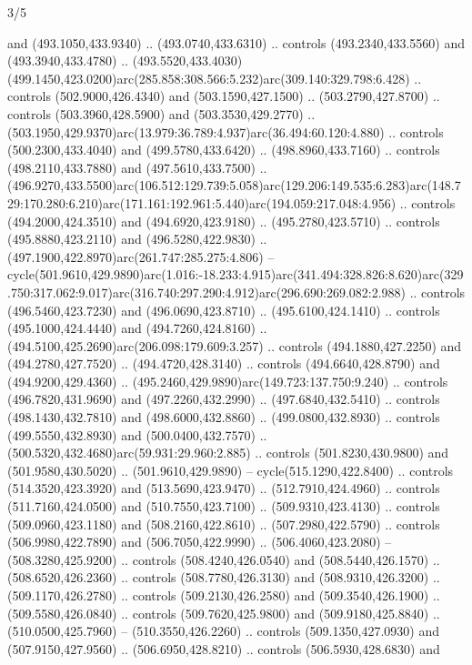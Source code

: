 \begin{flagdescription}{3/5}
\begin{scope}[shift={(0.5\flaglength,0.5\flagwidth)},scale=\flagwidth/510]
\begin{scope}[y=0.80pt, x=0.80pt, yscale=-1.06, xscale=1.06,yshift=-240pt,xshift=-400pt]
\begin{scope}[cm={{0.83333,0.0,0.0,0.83333,(154.64672,48.64761)}}]
\begin{scope}[cm={{0.93334,0.0,0.0,0.93334,(-4.86471,22.64035)}}]
\begin{scope}[draw=black]
  and (493.1050,433.9340) .. (493.0740,433.6310) .. controls (493.2340,433.5560)
  and (493.3940,433.4780) ..
  (493.5520,433.4030)(499.1450,423.0200)arc(285.858:308.566:5.232)arc(309.140:329.798:6.428)
  .. controls (502.9000,426.4340) and (503.1590,427.1500) .. (503.2790,427.8700)
  .. controls (503.3960,428.5900) and (503.3530,429.2770) ..
  (503.1950,429.9370)arc(13.979:36.789:4.937)arc(36.494:60.120:4.880) ..
  controls (500.2300,433.4040) and (499.5780,433.6420) .. (498.8960,433.7160) ..
  controls (498.2110,433.7880) and (497.5610,433.7500) ..
  (496.9270,433.5500)arc(106.512:129.739:5.058)arc(129.206:149.535:6.283)arc(148.729:170.280:6.210)arc(171.161:192.961:5.440)arc(194.059:217.048:4.956)
  .. controls (494.2000,424.3510) and (494.6920,423.9180) .. (495.2780,423.5710)
  .. controls (495.8880,423.2110) and (496.5280,422.9830) ..
  (497.1900,422.8970)arc(261.747:285.275:4.806) --
  cycle(501.9610,429.9890)arc(1.016:-18.233:4.915)arc(341.494:328.826:8.620)arc(329.750:317.062:9.017)arc(316.740:297.290:4.912)arc(296.690:269.082:2.988)
  .. controls (496.5460,423.7230) and (496.0690,423.8710) .. (495.6100,424.1410)
  .. controls (495.1000,424.4440) and (494.7260,424.8160) ..
  (494.5100,425.2690)arc(206.098:179.609:3.257) .. controls (494.1880,427.2250)
  and (494.2780,427.7520) .. (494.4720,428.3140) .. controls (494.6640,428.8790)
  and (494.9200,429.4360) .. (495.2460,429.9890)arc(149.723:137.750:9.240) ..
  controls (496.7820,431.9690) and (497.2260,432.2990) .. (497.6840,432.5410) ..
  controls (498.1430,432.7810) and (498.6000,432.8860) .. (499.0800,432.8930) ..
  controls (499.5550,432.8930) and (500.0400,432.7570) ..
  (500.5320,432.4680)arc(59.931:29.960:2.885) .. controls (501.8230,430.9800)
  and (501.9580,430.5020) .. (501.9610,429.9890) -- cycle(515.1290,422.8400) ..
  controls (514.3520,423.3920) and (513.5690,423.9470) .. (512.7910,424.4960) ..
  controls (511.7160,424.0500) and (510.7550,423.7100) .. (509.9310,423.4130) ..
  controls (509.0960,423.1180) and (508.2160,422.8610) .. (507.2980,422.5790) ..
  controls (506.9980,422.7890) and (506.7050,422.9990) .. (506.4060,423.2080) --
  (508.3280,425.9200) .. controls (508.4240,426.0540) and (508.5440,426.1570) ..
  (508.6520,426.2360) .. controls (508.7780,426.3130) and (508.9310,426.3200) ..
  (509.1170,426.2780) .. controls (509.2130,426.2580) and (509.3540,426.1900) ..
  (509.5580,426.0840) .. controls (509.7620,425.9800) and (509.9180,425.8840) ..
  (510.0500,425.7960) -- (510.3550,426.2260) .. controls (509.1350,427.0930) and
  (507.9150,427.9560) .. (506.6950,428.8210) .. controls (506.5930,428.6830) and

\end{scope}
\end{scope}
\end{scope}
\end{scope}
\end{scope}
\end{flagdescription}
